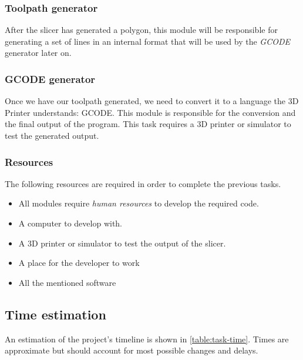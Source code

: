 \subsubsection{Toolpath generator}
After the slicer has generated a polygon, this module will be responsible for generating a set of lines in an internal format that will be used by the \emph{GCODE} generator later on.

\subsubsection{GCODE generator}
Once we have our toolpath generated, we need to convert it to a language the 3D Printer understands: GCODE. This module is responsible for the conversion and the final output of the program. This task requires a 3D printer or simulator to test the generated output.



\subsubsection{Resources}

The following resources are required in order to complete the previous tasks.

\begin{itemize}
    \item All modules require \emph{human resources} to develop the required code.
    \item A computer to develop with.
    \item A 3D printer or simulator to test the output of the slicer.
    \item A place for the developer to work
    \item All the mentioned software
\end{itemize}


\subsection{Time estimation}
An estimation of the project's timeline is shown in \autoref{table:task-time}. Times are approximate but should account for most possible changes and delays.

